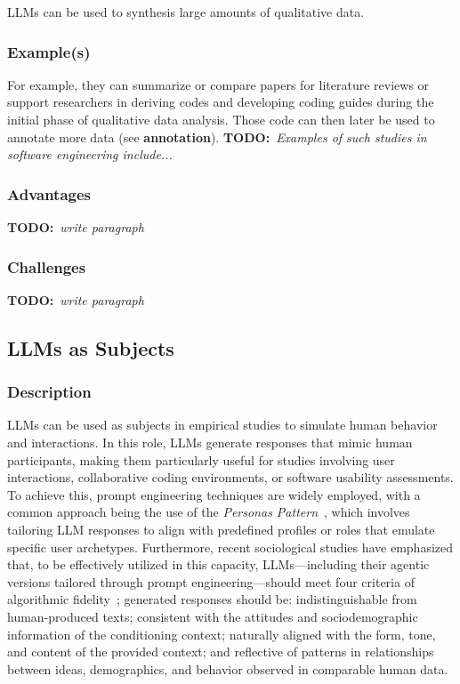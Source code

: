 \documentclass[11pt]{article}
\newcommand{\todo}[1]{{\textbf{TODO:}\ \textit{#1}}} %
\begin{document}
LLMs can be used to synthesis large amounts of qualitative data.

\subsubsection{Example(s)} 

For example, they can summarize or compare papers for literature reviews or support researchers in deriving codes and developing coding guides during the initial phase of qualitative data analysis. Those code can then later be used to annotate more data (see \textbf{annotation}). \todo{Examples of such studies in software engineering include...}

\subsubsection{Advantages}

\todo{write paragraph}

\subsubsection{Challenges}

\todo{write paragraph}


\subsection{LLMs as Subjects}

\subsubsection{Description}

LLMs can be used as subjects in empirical studies to simulate human behavior and interactions. In this role, LLMs generate responses that mimic human participants, making them particularly useful for studies involving user interactions, collaborative coding environments, or software usability assessments. 
To achieve this, prompt engineering techniques are widely employed, with a common approach being the use of the \textit{Personas Pattern}~\cite{DBLP:journals/corr/abs-2308-07702}, which involves tailoring LLM responses to align with predefined profiles or roles that emulate specific user archetypes. 
Furthermore, recent sociological studies have emphasized that, to be effectively utilized in this capacity, LLMs—including their agentic versions tailored through prompt engineering—should meet four criteria of algorithmic fidelity~\cite{DBLP:journals/corr/abs-2209-06899}; generated responses should be: indistinguishable from human-produced texts; consistent with the attitudes and sociodemographic information of the conditioning context; naturally aligned with the form, tone, and content of the provided context; and reflective of patterns in relationships between ideas, demographics, and behavior observed in comparable human data.
\end{document}
